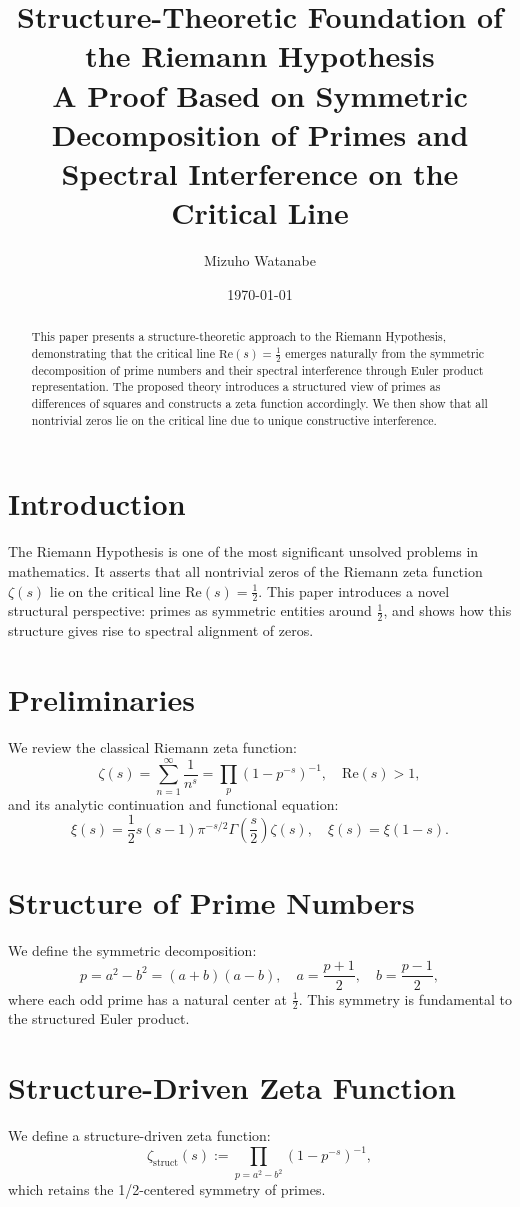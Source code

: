\documentclass[11pt]{article}
\title{\textbf{Structure-Theoretic Foundation of the Riemann Hypothesis}\\
\large A Proof Based on Symmetric Decomposition of Primes and Spectral Interference on the Critical Line}
\author{Mizuho Watanabe}
\date{\today}
\begin{document}
\maketitle

\begin{abstract}
This paper presents a structure-theoretic approach to the Riemann Hypothesis, demonstrating that the critical line $\text{Re}(s) = \frac{1}{2}$ emerges naturally from the symmetric decomposition of prime numbers and their spectral interference through Euler product representation. The proposed theory introduces a structured view of primes as differences of squares and constructs a zeta function accordingly. We then show that all nontrivial zeros lie on the critical line due to unique constructive interference.
\end{abstract}

\section{Introduction}
The Riemann Hypothesis is one of the most significant unsolved problems in mathematics. It asserts that all nontrivial zeros of the Riemann zeta function $\zeta(s)$ lie on the critical line $\text{Re}(s) = \frac{1}{2}$. This paper introduces a novel structural perspective: primes as symmetric entities around $\frac{1}{2}$, and shows how this structure gives rise to spectral alignment of zeros.

\section{Preliminaries}
We review the classical Riemann zeta function:
\[
\zeta(s) = \sum_{n=1}^{\infty} \frac{1}{n^s} = \prod_{p} \left(1 - p^{-s} \right)^{-1}, \quad \text{Re}(s) > 1,
\]
and its analytic continuation and functional equation:
\[
\xi(s) = \frac{1}{2} s(s - 1) \pi^{-s/2} \Gamma\left( \frac{s}{2} \right) \zeta(s), \quad \xi(s) = \xi(1 - s).
\]

\section{Structure of Prime Numbers}
We define the symmetric decomposition:
\[
p = a^2 - b^2 = (a + b)(a - b), \quad a = \frac{p+1}{2},\quad b = \frac{p-1}{2},
\]
where each odd prime has a natural center at $\frac{1}{2}$. This symmetry is fundamental to the structured Euler product.

\section{Structure-Driven Zeta Function}
We define a structure-driven zeta function:
\[
\zeta_{\text{struct}}(s) := \prod_{p = a^2 - b^2} \left(1 - p^{-s} \right)^{-1},
\]
which retains the 1/2-centered symmetry of primes.
\end{document}
